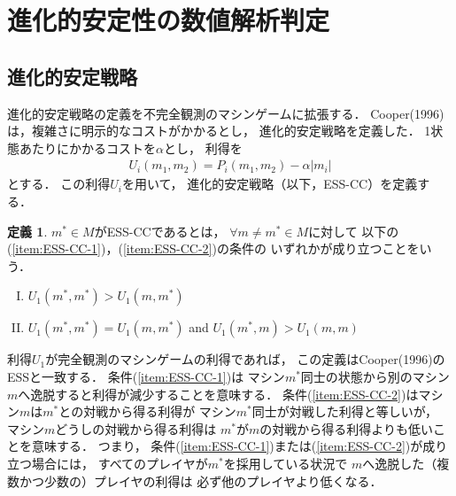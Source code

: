 \documentclass[submit]{ipsj}
\theoremstyle{definition}
\newtheorem{definition}{定義}
\begin{document}
\section{進化的安定性の数値解析判定} \label{sec:ess}

\subsection{進化的安定戦略} \label{sec:def-ess}

進化的安定戦略の定義を不完全観測のマシンゲームに拡張する．
Cooper(1996)は，複雑さに明示的なコストがかかるとし，
進化的安定戦略を定義した．
1状態あたりにかかるコストを$\alpha$とし，
利得を
\begin{align}
  U_i(m_1, m_2) = P_i(m_1, m_2) - \alpha |m_i| \nonumber
\end{align}
とする．
この利得$U_i$を用いて，
進化的安定戦略（以下，ESS-CC）を定義する．
\begin{definition} \label{def:ESS-CC}
  $m^{\ast} \in M$がESS-CCであるとは，
  $\forall m \neq m^{\ast} \in M$に対して
  以下の(\ref{item:ESS-CC-1})，(\ref{item:ESS-CC-2})の条件の
  いずれかが成り立つことをいう．
  \begin{enumerate}[(I)]
    \item $U_1(m^{\ast}, m^{\ast}) > U_1(m, m^{\ast})$ \label{item:ESS-CC-1}
    \item $U_1(m^{\ast}, m^{\ast}) = U_1(m, m^{\ast})$ and $U_1(m^{\ast}, m) > U_1(m, m)$ \label{item:ESS-CC-2}
  \end{enumerate}
\end{definition}

利得$U_1$が完全観測のマシンゲームの利得であれば，
この定義はCooper(1996)のESSと一致する．
条件(\ref{item:ESS-CC-1})は
マシン$m^{\ast}$同士の状態から別のマシン$m$へ逸脱すると利得が減少することを意味する．
条件(\ref{item:ESS-CC-2})はマシン$m$は$m^{\ast}$との対戦から得る利得が
マシン$m^{\ast}$同士が対戦した利得と等しいが，
マシン$m$どうしの対戦から得る利得は
$m^{\ast}$が$m$の対戦から得る利得よりも低いことを意味する．
つまり，
条件(\ref{item:ESS-CC-1})または(\ref{item:ESS-CC-2})が成り立つ場合には，
すべてのプレイヤが$m^{\ast}$を採用している状況で
$m$へ逸脱した（複数かつ少数の）プレイヤの利得は
必ず他のプレイヤより低くなる．
\end{document}
